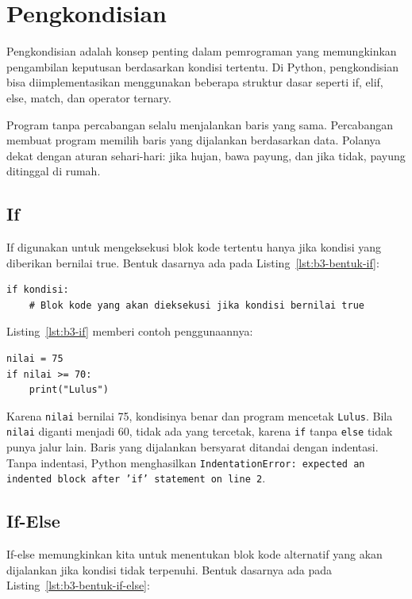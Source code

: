 \section{Pengkondisian}
Pengkondisian adalah konsep penting dalam pemrograman yang memungkinkan pengambilan keputusan berdasarkan kondisi tertentu. Di Python, pengkondisian bisa diimplementasikan menggunakan beberapa struktur dasar seperti if, elif, else, match, dan operator ternary.

Program tanpa percabangan selalu menjalankan baris yang sama. Percabangan membuat program memilih baris yang dijalankan berdasarkan data. Polanya dekat dengan aturan sehari-hari: jika hujan, bawa payung, dan jika tidak, payung ditinggal di rumah.

\subsection{If}
If digunakan untuk mengeksekusi blok kode tertentu hanya jika kondisi yang diberikan bernilai true. Bentuk dasarnya ada pada Listing~\ref{lst:b3-bentuk-if}:

\begin{lstlisting}[style=PythonStyle, caption={Bentuk dasar if}, label={lst:b3-bentuk-if}]
if kondisi:
    # Blok kode yang akan dieksekusi jika kondisi bernilai true
\end{lstlisting}

Listing~\ref{lst:b3-if} memberi contoh penggunaannya:

\begin{lstlisting}[style=PythonStyle, caption={Kode Python: if_statement.py}, label={lst:b3-if}]
nilai = 75
if nilai >= 70:
    print("Lulus")
\end{lstlisting}

Karena \texttt{nilai} bernilai 75, kondisinya benar dan program mencetak \texttt{Lulus}. Bila \texttt{nilai} diganti menjadi 60, tidak ada yang tercetak, karena \texttt{if} tanpa \texttt{else} tidak punya jalur lain. Baris yang dijalankan bersyarat ditandai dengan indentasi. Tanpa indentasi, Python menghasilkan \texttt{IndentationError: expected an indented block after 'if' statement on line 2}.

\subsection{If-Else}
If-else memungkinkan kita untuk menentukan blok kode alternatif yang akan dijalankan jika kondisi tidak terpenuhi. Bentuk dasarnya ada pada Listing~\ref{lst:b3-bentuk-if-else}:

